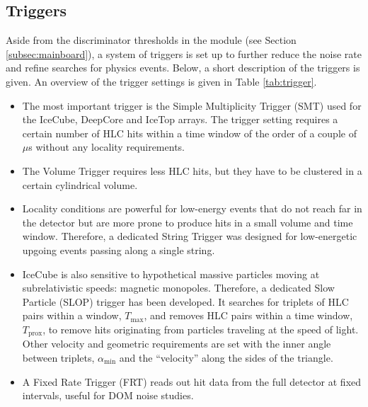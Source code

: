 \subsection{Triggers}
\label{subsec:triggers}
Aside from the discriminator thresholds in the module (see Section \ref{subsec:mainboard}), a system of triggers is set up to further reduce the noise rate and refine searches for physics events. Below, a short description of the triggers is given. An overview of the trigger settings is given in Table \ref{tab:trigger}. 

\vspace{2mm}
\begin{itemize}
\item The most important trigger is the Simple Multiplicity Trigger (SMT) used for the IceCube, DeepCore and IceTop arrays. The trigger setting requires a certain number of HLC hits within a time window of the order of a couple of $\mu$s without any locality requirements.
\item The Volume Trigger requires less HLC hits, but they have to be clustered in a certain cylindrical volume. 
\item Locality conditions are powerful for low-energy events that do not reach far in the detector but are more prone to produce hits in a small volume and time window. Therefore, a dedicated String Trigger was designed for low-energetic upgoing events passing along a single string. 
\item IceCube is also sensitive to hypothetical massive particles moving at subrelativistic speeds: magnetic monopoles. Therefore, a dedicated Slow Particle (SLOP) trigger has been developed. It searches for triplets of HLC pairs within a window, $T_{\textrm{max}}$, and removes HLC pairs within a time window, $T_{\textrm{prox}}$, to remove hits originating from particles traveling at the speed of light. Other velocity and geometric requirements are set with the inner angle between triplets, $\alpha_{\textrm{min}}$ and the ``velocity'' along the sides of the triangle.
\item A Fixed Rate Trigger (FRT) reads out hit data from the full detector at fixed intervals, useful for DOM noise studies.
\end{itemize}
\vspace{2mm}

